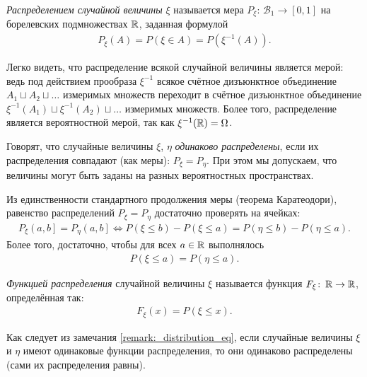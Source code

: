\documentclass[../main.tex]{subfiles}
\begin{document}
\begin{df}
 \textit{Распределением случайной величины} $\xi$ называется мера $ P_{\xi} \colon\, \mathcal B_1 \to [0, 1] $ на борелевских подмножествах $\mathbb{R}$, заданная формулой
 \begin{align*}
  P_{\xi}(A) = P(\xi \in A) = P(\xi^{-1}(A)).
 \end{align*} 
\end{df}
\begin{remrk*}
 Легко видеть, что распределение всякой случайной величины является мерой: ведь под действием прообраза $ \xi^{-1} $ всякое счётное дизъюнктное объединение $ A_1 \sqcup A_2 \sqcup \ldots $ измеримых множеств переходит в счётное дизъюнктное объединение $ \xi^{-1}(A_1) \sqcup \xi^{-1}(A_2) \sqcup \ldots $ измеримых множеств. Более того, распределение является вероятностной мерой, так как $ \xi^{-1}(\mathbb{R}) = \Omega $.
\end{remrk*}
\begin{df*}
 Говорят, что случайные величины $\xi$, $\eta$ \textit{одинаково распределены}, если их распределения совпадают (как меры): $P_{\xi} = P_{\eta}$. При этом мы допускаем, что величины могут быть заданы на разных вероятностных пространствах.
\end{df*}
\begin{remrk}
 \label{remark:_distribution_eq}
 Из единственности стандартного продолжения меры (теорема Каратеодори), равенство распределений $P_{\xi} = P_{\eta}$  достаточно проверять на ячейках:
 \begin{align*}
  P_{\xi} \left(a, b\right] = P_{\eta} \left(a, b\right]  \iff P(\xi \leqslant b) - P(\xi \leqslant a) =  P(\eta \leqslant b) - P(\eta \leqslant a)
 .\end{align*} Более того, достаточно, чтобы для всех $a \in \mathbb{R}$ выполнялось
 \begin{align*}
  P(\xi \leqslant a) = P(\eta \leqslant a).
 \end{align*} 
\end{remrk}
\begin{df}
 \textit{Функцией распределения} случайной величины $\xi$ называется функция $F_{\xi} \colon\, \mathbb{R} \to \mathbb{R}$, определённая так:
 \begin{align*}
  F_{\xi}(x) = P(\xi \leqslant x).
 \end{align*} 
\end{df}
\begin{remrk*}
 Как следует из замечания \ref{remark:_distribution_eq}, если случайные величины $ \xi $ и $ \eta $ имеют одинаковые функции распределения, то они одинаково распределены (сами их распределения равны).
\end{remrk*}
\end{document}
